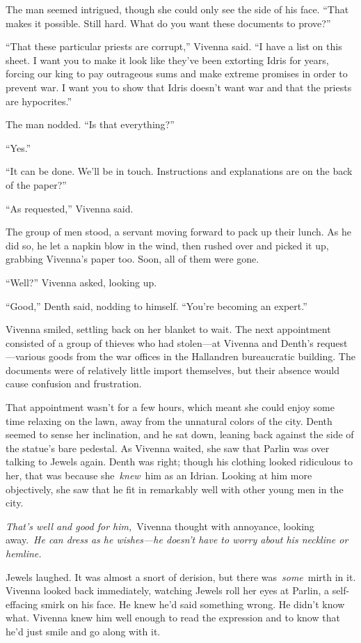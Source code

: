The man seemed intrigued, though she could only see the side of his face. “That makes it possible. Still hard. What do you want these documents to prove?”

“That these particular priests are corrupt,” Vivenna said. “I have a list on this sheet. I want you to make it look like they’ve been extorting Idris for years, forcing our king to pay outrageous sums and make extreme promises in order to prevent war. I want you to show that Idris doesn’t want war and that the priests are hypocrites.”

The man nodded. “Is that everything?”

“Yes.”

“It can be done. We’ll be in touch. Instructions and explanations are on the back of the paper?”

“As requested,” Vivenna said.

The group of men stood, a servant moving forward to pack up their lunch. As he did so, he let a napkin blow in the wind, then rushed over and picked it up, grabbing Vivenna’s paper too. Soon, all of them were gone.

“Well?” Vivenna asked, looking up.

“Good,” Denth said, nodding to himself. “You’re becoming an expert.”

Vivenna smiled, settling back on her blanket to wait. The next appointment consisted of a group of thieves who had stolen—at Vivenna and Denth’s request—various goods from the war offices in the Hallandren bureaucratic building. The documents were of relatively little import themselves, but their absence would cause confusion and frustration.

That appointment wasn’t for a few hours, which meant she could enjoy some time relaxing on the lawn, away from the unnatural colors of the city. Denth seemed to sense her inclination, and he sat down, leaning back against the side of the statue’s bare pedestal. As Vivenna waited, she saw that Parlin was over talking to Jewels again. Denth was right; though his clothing looked ridiculous to her, that was because she~\textit{knew}~him as an Idrian. Looking at him more objectively, she saw that he fit in remarkably well with other young men in the city.

\textit{That’s well and good for him,}~Vivenna thought with annoyance, looking away.~\textit{He can dress as he wishes—he doesn’t have to worry about his neckline or hemline.}

Jewels laughed. It was almost a snort of derision, but there was~\textit{some}~mirth in it. Vivenna looked back immediately, watching Jewels roll her eyes at Parlin, a self-effacing smirk on his face. He knew he’d said something wrong. He didn’t know what. Vivenna knew him well enough to read the expression and to know that he’d just smile and go along with it.

